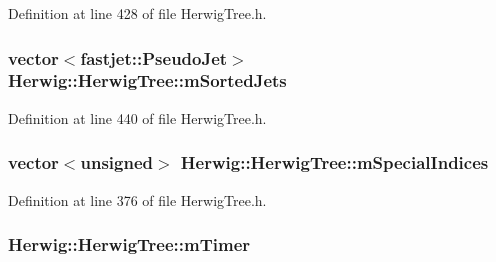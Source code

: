 Definition at line 428 of file Herwig\+Tree.\+h.

\subsubsection[{\texorpdfstring{m\+Sorted\+Jets}{mSortedJets}}]{\setlength{\rightskip}{0pt plus 5cm}vector$<$fastjet\+::\+Pseudo\+Jet$>$ Herwig\+::\+Herwig\+Tree\+::m\+Sorted\+Jets\hspace{0.3cm}{\ttfamily [protected]}}\hypertarget{class_herwig_1_1_herwig_tree_a2d63c5091aefdf707d992bd80830e76b}{}\label{class_herwig_1_1_herwig_tree_a2d63c5091aefdf707d992bd80830e76b}


Definition at line 440 of file Herwig\+Tree.\+h.

\subsubsection[{\texorpdfstring{m\+Special\+Indices}{mSpecialIndices}}]{\setlength{\rightskip}{0pt plus 5cm}vector$<$unsigned$>$ Herwig\+::\+Herwig\+Tree\+::m\+Special\+Indices\hspace{0.3cm}{\ttfamily [protected]}}\hypertarget{class_herwig_1_1_herwig_tree_aa1b6f46c32e4d9ccf20dce2515cfd1e7}{}\label{class_herwig_1_1_herwig_tree_aa1b6f46c32e4d9ccf20dce2515cfd1e7}


Definition at line 376 of file Herwig\+Tree.\+h.

\subsubsection[{\texorpdfstring{m\+Timer}{mTimer}}]{ Herwig\+::\+Herwig\+Tree\+::m\+Timer\hspace{0.3cm}{\ttfamily [protected]}}\hypertarget{class_herwig_1_1_herwig_tree_a72fcb4b6832d4782d0096c4a16a16683}{}\label{class_herwig_1_1_herwig_tree_a72fcb4b6832d4782d0096c4a16a16683}



